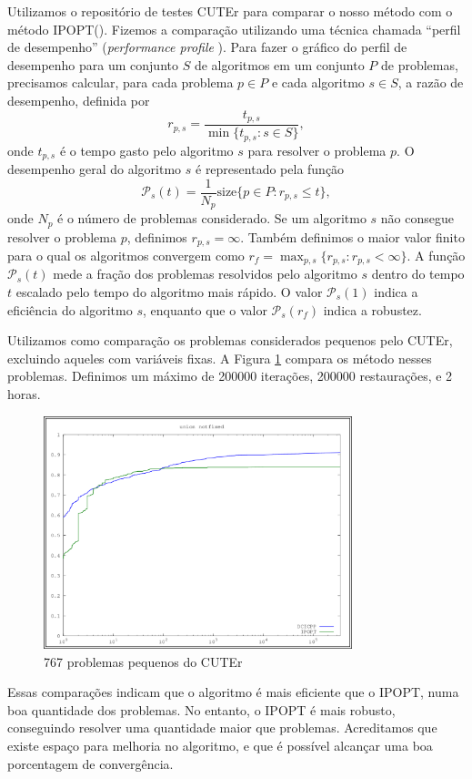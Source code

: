 \documentclass[letterpaper,12pt]{article}
\numberwithin{equation}{section}
\begin{document}
Utilizamos o repositório de testes CUTEr para comparar o nosso método
com o método IPOPT(\cite{bib:ipopt}). Fizemos a comparação utilizando uma técnica chamada
``perfil de desempenho'' ({\it performance profile}
\cite{bib:performance-profile}).
Para fazer o gráfico do perfil de desempenho para um conjunto $S$ de
algoritmos em um conjunto $P$ de problemas, precisamos calcular, para
cada problema $p \in P$ e cada algoritmo $s \in S$, a razão de
desempenho, definida por
$$r_{p,s} = \frac{ t_{p,s} }{ \min\{t_{p,s} : s \in S\} },$$
onde $t_{p,s}$ é o tempo gasto pelo algoritmo $s$ para resolver o
problema $p$. O desempenho geral do algoritmo $s$ é representado
pela função
$$\mathcal{P}_s(t) = \frac{1}{N_p} \mbox{size}\{p \in P : r_{p,s} \leq t\},$$
onde $N_p$ é o número de problemas considerado. Se um algoritmo $s$ não
consegue resolver o problema $p$, definimos $r_{p,s} = \infty$.
Também definimos o maior valor finito para o qual os algoritmos
convergem como $r_f = \max_{p,s} \{r_{p,s} : r_{p,s} < \infty\}.$
A função $\mathcal{P}_s(t)$ mede a fração dos problemas resolvidos
pelo algoritmo $s$ dentro do tempo $t$ escalado pelo tempo do 
algoritmo mais rápido. 
O valor $\mathcal{P}_s(1)$ indica a eficiência do algoritmo $s$,
enquanto que o valor $\mathcal{P}_s(r_f)$ indica a robustez.

Utilizamos como comparação os problemas considerados pequenos pelo CUTEr,
excluindo aqueles com variáveis fixas.
A Figura \ref{fig:small-all} compara os método nesses problemas.
Definimos um máximo de 200000 iterações, 200000 restaurações, e 2 horas.
\begin{figure}[!ht]
\centering
\includegraphics[width=0.8\textwidth]{union_notfixed_strict.png}
\caption{767 problemas pequenos do CUTEr}
\label{fig:small-all}
\end{figure}
Essas comparações indicam que o algoritmo é mais eficiente
que o IPOPT, numa boa quantidade dos problemas. No entanto,
o IPOPT é mais robusto, conseguindo resolver uma quantidade
maior que problemas. Acreditamos que existe espaço para
melhoria no algoritmo, e que é possível alcançar uma boa
porcentagem de convergência.
\end{document}
